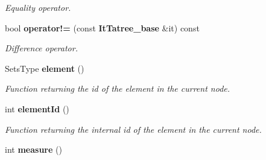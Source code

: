 \begin{CompactItemize}
\begin{CompactList}\small\item\em Equality operator. \item\end{CompactList}\item 
bool {\bf operator!=} (const {\bf It\-Tatree\_\-base} \&it) const \label{class_it_tatree__base_8f73b720ada11494625c5be33f7852d5}

\begin{CompactList}\small\item\em Difference operator. \item\end{CompactList}\item 
Sets\-Type {\bf element} ()\label{class_it_tatree__base_56bc4c0350976556eb66d305c20283bb}

\begin{CompactList}\small\item\em Function returning the id of the element in the current node. \item\end{CompactList}\item 
int {\bf element\-Id} ()\label{class_it_tatree__base_44b5064f0430ec6d5e08cc9d4edc9168}

\begin{CompactList}\small\item\em Function returning the internal id of the element in the current node. \item\end{CompactList}\item 
int {\bf measure} ()\label{class_it_tatree__base_3cb8b5a30e8b7292fa9a789fd06f5a09}


\end{CompactItemize}

